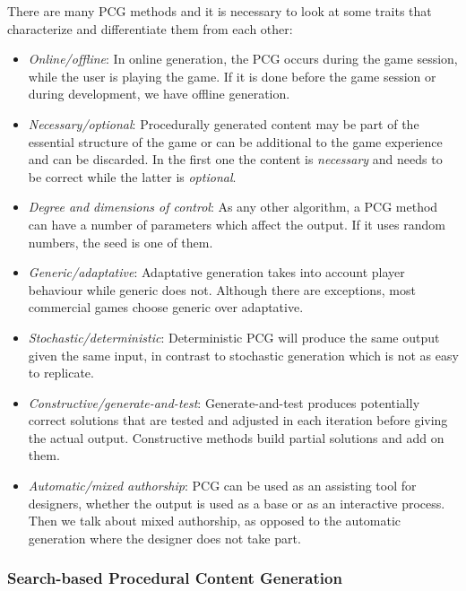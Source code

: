 There are many PCG methods and it is necessary to look at some traits that characterize and differentiate them from each other: \cite{togelius2016introduction}

\begin{itemize}
	\item \textit{Online/offline}: In online generation, the PCG occurs during the game session, while the user is playing the game. If it is done before the game session or during development, we have offline generation. 
	\item \textit{Necessary/optional}: Procedurally generated content may be part of the essential structure of the game or can be additional to the game experience and can be discarded. In the first one the content is \textit{necessary} and needs to be correct while the latter is \textit{optional}.
	\item \textit{Degree and dimensions of control}: As any other algorithm, a PCG method can have a number of parameters which affect the output. If it uses random numbers, the seed is one of them.
	\item \textit{Generic/adaptative}: Adaptative generation takes into account player behaviour while generic does not. Although there are exceptions, most commercial games choose generic over adaptative.
	\item \textit{Stochastic/deterministic}: Deterministic PCG will produce the same output given the same input, in contrast to stochastic generation which is not as easy to replicate. 
	\item \textit{Constructive/generate-and-test}: Generate-and-test produces potentially correct solutions that are tested and adjusted in each iteration before giving the actual output. Constructive methods build partial solutions and add on them.
	\item \textit{Automatic/mixed authorship}: PCG can be used as an assisting tool for designers, whether the output is used as a base or as an interactive process. Then we talk about mixed authorship, as opposed to the automatic generation where the designer does not take part. 
\end{itemize}

\subsubsection{Search-based Procedural Content Generation}

